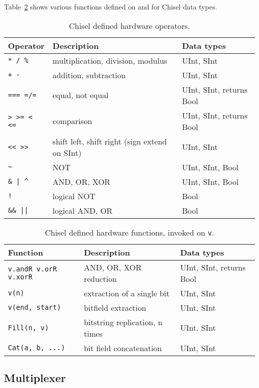\documentclass[%
    10pt,
    headinclude, footexclude,
    openright, %
    notitlepage,
    cleardoubleempty,
    headsepline,
    pointlessnumbers,
    bibtotoc, idxtotoc,
    ]{scrbook}
\newcommand{\code}[1]{{\small{\texttt{#1}}}}
\begin{document}
Table~\ref{tab:functions} shows various functions defined on and for Chisel data types.

\begin{table}
 \centering
 \label{tab:operators}
  \begin{tabular}{lll}
    \toprule
    Operator & Description & Data types \\
    \midrule
    \code{* / \%} & multiplication, division, modulus & UInt, SInt \\
    \code{+ -} & addition, subtraction & UInt, SInt \\
    \code{=== =/=} & equal, not equal & UInt, SInt, returns Bool \\
    \code{> >= < <=} & comparison & UInt, SInt, returns Bool \\
    \code{<< >>} & shift left, shift right (sign extend on SInt) & UInt, SInt \\
    \code{\~} & NOT & UInt, SInt, Bool \\
    \code{\& | \^} & AND, OR, XOR & UInt, SInt, Bool \\
    \code{!} & logical NOT & Bool \\
    \code{\&\& ||} & logical AND, OR & Bool \\
    \bottomrule 
  \end{tabular} 
  \caption{Chisel defined hardware operators.}
\end{table}

\begin{table}
 \centering
 \label{tab:functions}
  \begin{tabular}{lll}
    \toprule
    Function & Description & Data types \\
    \midrule
    \code{v.andR v.orR v.xorR} & AND, OR, XOR reduction & UInt, SInt, returns Bool \\
    \code{v(n)} & extraction of a single bit & UInt, SInt \\
    \code{v(end, start)} & bitfield extraction & UInt, SInt \\
    \code{Fill(n, v)} & bitstring replication, n times & UInt, SInt \\
    \code{Cat(a, b, ...)} & bit field concatenation & UInt, SInt \\
    \bottomrule 
  \end{tabular} 
  \caption{Chisel defined hardware functions, invoked on \code{v}.}
\end{table}                                            
    

\subsection{Multiplexer}
\end{document}
